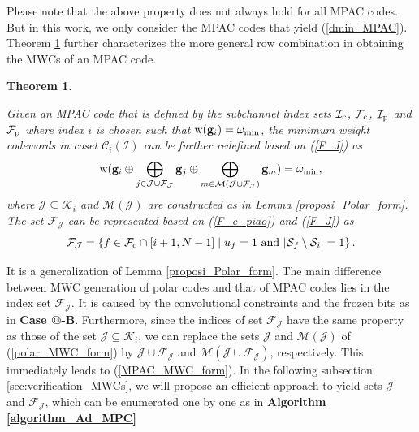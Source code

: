 \documentclass[12pt, draftclsnofoot, peerreview, onecolumn]{IEEEtran}
\makeatletter
\theoremstyle{noparent}
\newtheorem{theorem}{\textbf{Theorem}}
\newcommand{\Rmnum}[1]{\expandafter\@slowromancap\romannumeral #1@}
\renewenvironment{proof}[1][\proofname]{\par
  \pushQED{\qed}
  \normalfont \topsep6\p@\@plus6\p@\relax
  \trivlist
  \item[\hskip\labelsep
        \itshape
    #1\@addpunct{:}]\ignorespaces
}{
  \popQED\endtrivlist\@endpefalse
}
\makeatother
\begin{document}
Please note that the above property does not always hold for all MPAC codes.
But in this work, we only consider the MPAC codes that yield (\ref{dmin_MPAC}).
Theorem \ref{theorem_MPAC_form} further characterizes the more
general row combination in obtaining the MWCs of an MPAC code. 


\begin{theorem}
    \label{theorem_MPAC_form}
    
    Given an MPAC code that is defined by the subchannel index sets $\mathcal{I}_{\rm c}$, $\mathcal{F}_{\rm c}$, $\mathcal{I}_{\rm p}$ and $\mathcal{F}_{\rm p}$ where index $i$ is chosen such that ${\rm w}(\mathbf{g}_i)=\omega_{\min}$,
    the minimum weight codewords in coset $\mathcal{C}_i(\mathcal{I})$ can be further redefined based on (\ref{F_J}) as
    \begin{equation}
        \label{MPAC_MWC_form}
        {\rm w}(\mathbf{g}_i \oplus \bigoplus_{j \in \mathcal{J} \cup \mathcal{F}_\mathcal{J}} \mathbf{g}_j \oplus \bigoplus_{m \in \mathcal{M}(\mathcal{J} \cup \mathcal{F}_\mathcal{J})} \mathbf{g}_m )=\omega_{\rm min},
    \end{equation}
    where $\mathcal{J} \subseteq \mathcal{K}_i$ and $\mathcal{M}(\mathcal{J})$ 
    are constructed as in Lemma \ref{proposi_Polar_form}.
    The set $\mathcal{F}_{\mathcal{J}}$ can be represented based on (\ref{F_c_piao}) and (\ref{F_J}) as
    $$\mathcal{F}_{\mathcal{J}}=\left\{f \in \mathcal{F}_{\rm c}\cap[i+1,N-1] \mid u_f=1\ \text{and}\ |\mathcal{S}_f \setminus \mathcal{S}_i|=1\right\}.$$
\end{theorem}

\begin{proof}[\hspace{1.5em}Proof]
    It is a generalization of Lemma \ref{proposi_Polar_form}.    
    The main difference between MWC generation of polar codes and that of MPAC codes lies in the index set $\mathcal{F}_\mathcal{J}$.
    It is caused by the convolutional constraints and 
    the frozen bits as in \textbf{Case \Rmnum{1}-B}.
    Furthermore, since the indices of set $\mathcal{F}_\mathcal{J}$ have the same property 
    as those of the set $\mathcal{J}\subseteq\mathcal{K}_i$,
    we can replace the sets $\mathcal{J}$ and $\mathcal{M}(\mathcal{J})$ of (\ref{polar_MWC_form}) 
    by $\mathcal{J} \cup \mathcal{F}_\mathcal{J}$
    and $\mathcal{M}(\mathcal{J} \cup \mathcal{F}_\mathcal{J})$, respectively.
    This immediately leads to (\ref{MPAC_MWC_form}).
    In the following subsection \ref{sec:verification_MWCs}, we will propose an efficient approach to yield sets $\mathcal{J}$ and $\mathcal{F}_\mathcal{J}$, which can be enumerated one by one as in {\bf Algorithm \ref{algorithm_Ad_MPC}}
\end{proof}
\end{document}

